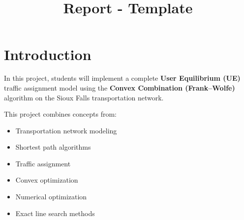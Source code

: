 \documentclass{rapportCS} %
\title{Report - Template}
\begin{document}







        
\fairemarges 
\fairepagedegarde 



\section{Introduction}

In this project, students will implement a complete \textbf{User Equilibrium (UE)} traffic assignment model using the \textbf{Convex Combination (Frank--Wolfe)} algorithm on the Sioux Falls transportation network.

This project combines concepts from:

\begin{itemize}
    \item Transportation network modeling
    \item Shortest path algorithms
    \item Traffic assignment
    \item Convex optimization
    \item Numerical optimization
    \item Exact line search methods
\end{itemize}
\end{document}
